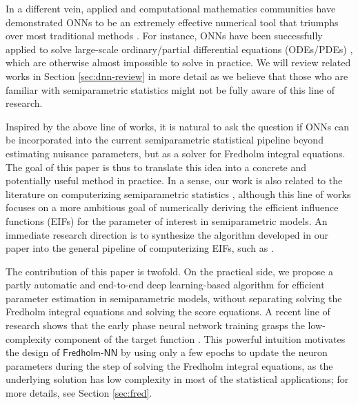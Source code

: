 \documentclass[11pt]{article}
\def\fred{\mathsf{Fredholm\mbox{-}NN}}
\begin{document}
In a different vein, applied and computational mathematics communities have demonstrated ONNs to be an extremely effective numerical tool that triumphs over most traditional methods \citep{e2020machine}. For instance, ONNs have been successfully applied to solve large-scale ordinary/partial differential equations (ODEs/PDEs) \citep{e2018deep, cai2019multi, li2020multi, luo2020two, zhang2021mod}, which are otherwise almost impossible to solve in practice. We will review related works in Section \ref{sec:dnn-review} in more detail as we believe that those who are familiar with semiparametric statistics might not be fully aware of this line of research.

Inspired by the above line of works, it is natural to ask the question if ONNs can be incorporated into the current semiparametric statistical pipeline beyond estimating nuisance parameters, but as a solver for Fredholm integral equations. The goal of this paper is thus to translate this idea into a concrete and potentially useful method in practice. In a sense, our work is also related to the literature on computerizing semiparametric statistics \citep{frangakis2015deductive, carone2019toward, williamson2020unified, bhattacharya2020semiparametric, mai2020semiparametric}, although this line of works focuses on a more ambitious goal of numerically deriving the efficient influence functions (EIFs) for the parameter of interest in semiparametric models. An immediate research direction is to synthesize the algorithm developed in our paper into the general pipeline of computerizing EIFs, such as \citet{carone2019toward}.

The contribution of this paper is twofold. On the practical side, we propose a partly automatic and end-to-end deep learning-based algorithm for efficient parameter estimation in semiparametric models, without separating solving the Fredholm integral equations and solving the score equations. A recent line of research shows that the early phase neural network training grasps the low-complexity component of the target function \citep{xu2018understanding, hu2020surprising, xu2020frequency}. This powerful intuition motivates the design of $\fred$ by using only a few epochs to update the neuron parameters during the step of solving the Fredholm integral equations, as the underlying solution has low complexity in most of the statistical applications; for more details, see Section \ref{sec:fred}.
\end{document}
